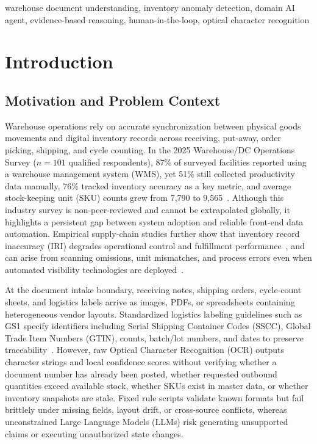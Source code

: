 \documentclass[conference]{IEEEtran}
\begin{document}
\begin{IEEEkeywords}
warehouse document understanding, inventory anomaly detection, domain AI agent, evidence-based reasoning, human-in-the-loop, optical character recognition
\end{IEEEkeywords}

\section{Introduction}

\subsection{Motivation and Problem Context}
Warehouse operations rely on accurate synchronization between physical goods movements and digital inventory records across receiving, put-away, order picking, shipping, and cycle counting. In the 2025 Warehouse/DC Operations Survey ($n = 101$ qualified respondents), 87\% of surveyed facilities reported using a warehouse management system (WMS), yet 51\% still collected productivity data manually, 76\% tracked inventory accuracy as a key metric, and average stock-keeping unit (SKU) counts grew from 7,790 to 9,565~\cite{b12}. Although this industry survey is non-peer-reviewed and cannot be extrapolated globally, it highlights a persistent gap between system adoption and reliable front-end data automation. Empirical supply-chain studies further show that inventory record inaccuracy (IRI) degrades operational control and fulfillment performance~\cite{b15,b16,b19}, and can arise from scanning omissions, unit mismatches, and process errors even when automated visibility technologies are deployed~\cite{b17,b18}.

At the document intake boundary, receiving notes, shipping orders, cycle-count sheets, and logistics labels arrive as images, PDFs, or spreadsheets containing heterogeneous vendor layouts. Standardized logistics labeling guidelines such as GS1 specify identifiers including Serial Shipping Container Codes (SSCC), Global Trade Item Numbers (GTIN), counts, batch/lot numbers, and dates to preserve traceability~\cite{b11}. However, raw Optical Character Recognition (OCR) outputs character strings and local confidence scores without verifying whether a document number has already been posted, whether requested outbound quantities exceed available stock, whether SKUs exist in master data, or whether inventory snapshots are stale. Fixed rule scripts validate known formats but fail brittlely under missing fields, layout drift, or cross-source conflicts, whereas unconstrained Large Language Models (LLMs) risk generating unsupported claims or executing unauthorized state changes.
\end{document}
